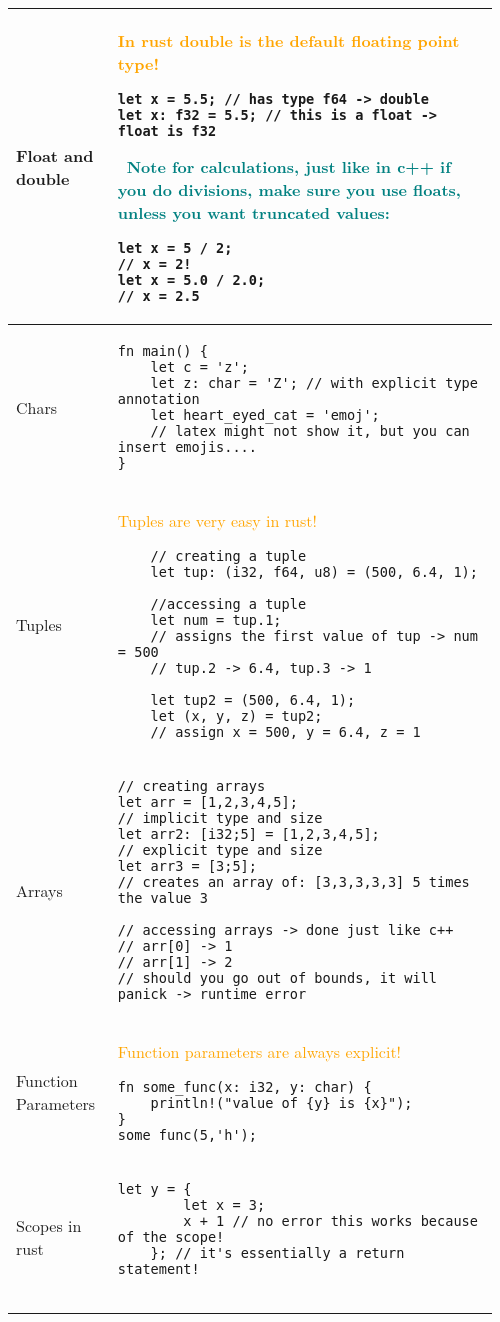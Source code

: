 \documentclass[main.tex,fontsize=8pt,paper=a4,paper=portrait,DIV=calc,]{scrartcl}
\begin{document}
\begin{table}[ht!]
\begin{tabular}{|m{0.2\linewidth}|m{0.755\linewidth}|}
\hline
Float and double & 
\textcolor{orange}{In rust double is the default floating point type!}\newline
\begin{lstlisting}
let x = 5.5; // has type f64 -> double
let x: f32 = 5.5; // this is a float -> float is f32
\end{lstlisting}
\, \newline 
\textcolor{teal}{Note for calculations, just like in c++ if you do divisions,
make sure you use floats, unless you want truncated values:}\newline
\begin{lstlisting}
let x = 5 / 2;
// x = 2!
let x = 5.0 / 2.0;
// x = 2.5
\end{lstlisting}
\\
\hline
Chars & 
\begin{lstlisting}
fn main() {
    let c = 'z';
    let z: char = 'Z'; // with explicit type annotation
    let heart_eyed_cat = 'emoj';
    // latex might not show it, but you can insert emojis....
}
\end{lstlisting}\\
\hline
Tuples & 
\textcolor{orange}{Tuples are very easy in rust!}\newline
\begin{lstlisting}
    // creating a tuple
    let tup: (i32, f64, u8) = (500, 6.4, 1);

    //accessing a tuple
    let num = tup.1;
    // assigns the first value of tup -> num = 500
    // tup.2 -> 6.4, tup.3 -> 1

    let tup2 = (500, 6.4, 1);
    let (x, y, z) = tup2;
    // assign x = 500, y = 6.4, z = 1
\end{lstlisting}\\
\hline
Arrays & 
\begin{lstlisting}
// creating arrays
let arr = [1,2,3,4,5];
// implicit type and size
let arr2: [i32;5] = [1,2,3,4,5];
// explicit type and size
let arr3 = [3;5];
// creates an array of: [3,3,3,3,3] 5 times the value 3

// accessing arrays -> done just like c++
// arr[0] -> 1
// arr[1] -> 2
// should you go out of bounds, it will panick -> runtime error
\end{lstlisting}\\
\hline
Function Parameters &
\textcolor{orange}{Function parameters are always explicit!}\newline
\begin{lstlisting}
fn some_func(x: i32, y: char) {
    println!("value of {y} is {x}");
}
some_func(5,'h');
\end{lstlisting}\\
\hline
Scopes in rust & 
\begin{lstlisting}
let y = {
        let x = 3;
        x + 1 // no error this works because of the scope!
    }; // it's essentially a return statement!


\end{lstlisting}
\end{tabular}
\end{table}
\end{document}
